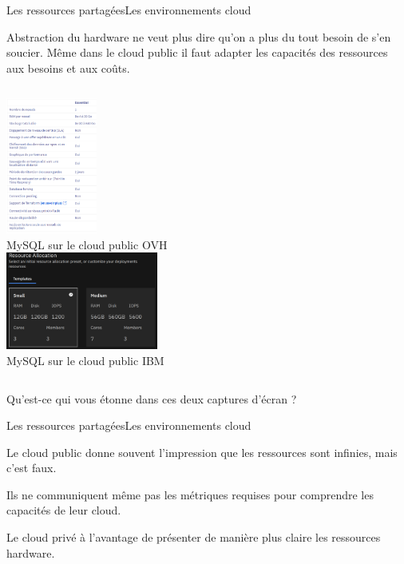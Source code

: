 \documentclass{beamer}
\begin{document}
    \begin{frame}{Les ressources partagées}{Les environnements cloud}
        \begin{dangercolorbox}
            Abstraction du hardware ne veut plus dire qu'on a plus du tout besoin de s'en soucier.
            Même dans le cloud public il faut adapter les capacités des ressources aux besoins et aux coûts.
        \end{dangercolorbox}
        \begin{columns}
            \centering
            \includegraphics[width=3cm]{image/ovh-public-mysql} \\ MySQL sur le cloud public OVH \\
            \centering
            \includegraphics[width=5cm]{image/ibm-public-mysql} \\ MySQL sur le cloud public IBM \\
        \end{columns}
        \flushleft
        \bigbreak
        Qu'est-ce qui vous étonne dans ces deux captures d'écran ?
    \end{frame}

    \begin{frame}{Les ressources partagées}{Les environnements cloud}

        Le cloud public donne souvent l'impression que les ressources sont infinies, mais c'est faux.

        Ils ne communiquent même pas les métriques requises pour comprendre les capacités de leur cloud.

        \bigbreak
        Le cloud privé à l'avantage de présenter de manière plus claire les ressources hardware.
    \end{frame}
\end{document}
